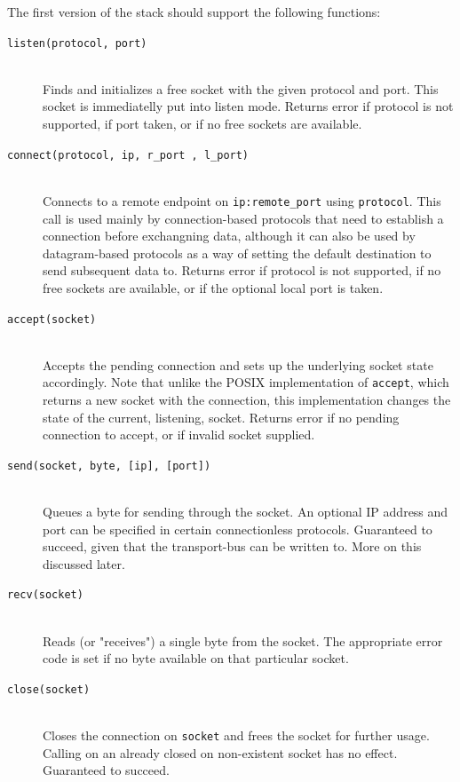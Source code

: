 The first version of the stack should support the following functions:
\begin{description}
\item[\texttt{listen(protocol, port)}]\hfill\\
    Finds and initializes a free socket with the given protocol and port. This
    socket is immediatelly put into listen mode.
    Returns error if protocol is not supported, if port taken, or if no free sockets
    are available.
\item[\texttt{connect(protocol, ip, r\_port , l\_port)}]\hfill\\
    Connects to a remote endpoint on \texttt{ip:remote\_port} using \texttt{protocol}.
    This call is used mainly by connection-based protocols that need to
    establish a connection before exchangning data, although it can also be used
    by datagram-based protocols as a way of setting the default destination to
    send subsequent data to.
    Returns error if protocol is not supported, if no free sockets are available,
    or if the optional local port is taken.

\item[\texttt{accept(socket)}]\hfill\\
    Accepts the pending connection and sets up the underlying socket state
    accordingly. Note that unlike the POSIX implementation of \texttt{accept},
    which returns a new socket with the connection, this implementation changes
    the state of the current, listening, socket.
    Returns error if no pending connection to accept, or if invalid socket
    supplied.

\item[\texttt{send(socket, byte, [ip], [port])}]\hfill\\
    Queues a byte for sending through the socket. An optional IP address and
    port can be specified in certain connectionless protocols.
    Guaranteed to succeed, given that the transport-bus can be written to. More
    on this discussed later.
\item[\texttt{recv(socket)}]\hfill\\
    Reads (or "receives") a single byte from the socket. The appropriate error
    code is set if no byte available on that particular socket.

\item[\texttt{close(socket)}]\hfill\\
    Closes the connection on \texttt{socket} and frees the socket for further
    usage. Calling on an already closed on non-existent socket has no effect.
    Guaranteed to succeed.

\end{description}

